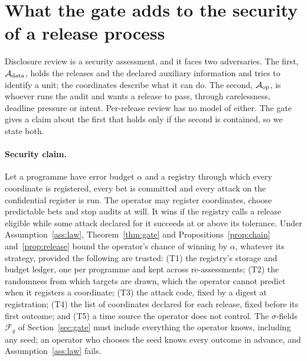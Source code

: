 \documentclass{jpc}
\theoremstyle{remark}
\newcommand{\F}{\mathcal F}
\begin{document}


\section{What the gate adds to the security of a release process}\label{sec:security}
Disclosure review is a security assessment, and it faces two adversaries. The first, $\mathcal A_{\rm data}$, holds the releases and the declared auxiliary information and tries to identify a unit; the coordinates describe what it can do. The second, $\mathcal A_{\rm op}$, is whoever runs the audit and wants a release to pass, through carelessness, deadline pressure or intent. Per-release review has no model of either. The gate gives a claim about the first that holds only if the second is contained, so we state both.

\paragraph{Security claim.} Let a programme have error budget $\alpha$ and a registry through which every coordinate is registered, every bet is committed and every attack on the confidential register is run. The operator may register coordinates, choose predictable bets and stop audits at will. It wins if the registry calls a release eligible while some attack declared for it succeeds at or above its tolerance. Under Assumption~\ref{ass:law}, Theorem~\ref{thm:gate} and Propositions~\ref{prop:chain} and~\ref{prop:release} bound the operator's chance of winning by $\alpha$, whatever its strategy, provided the following are trusted: (T1) the registry's storage and budget ledger, one per programme and kept across re-assessments; (T2) the randomness from which targets are drawn, which the operator cannot predict when it registers a coordinate; (T3) the attack code, fixed by a digest at registration; (T4) the list of coordinates declared for each release, fixed before its first outcome; and (T5) a time source the operator does not control. The $\sigma$-fields $\F_g$ of Section~\ref{sec:gate} must include everything the operator knows, including any seed; an operator who chooses the seed knows every outcome in advance, and Assumption~\ref{ass:law} fails.
\end{document}

